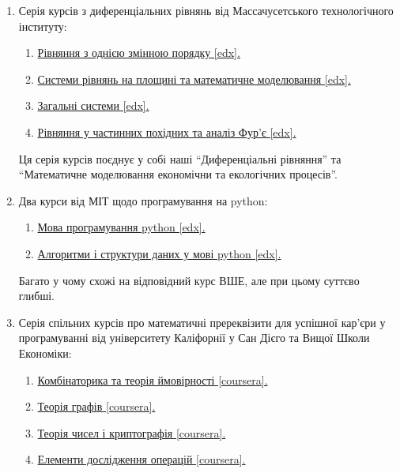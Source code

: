 \documentclass[14pt, a4paper]{extarticle}  %
\begin{document}
\begin{enumerate}
    \item Серія курсів з диференціальних рівнянь від Массачусетського технологічного інституту:
    \begin{enumerate}
    	\item \href{https://www.edx.org/course/introduction-differential-equations-mitx-18-031x}{Рівняння з однією змінною порядку [edx].}
    	\item \href{https://www.edx.org/course/differential-equations-2x2-systems-mitx-18-032x}{Системи рівнянь на площині та математичне моделювання [edx].}
    	\item \href{https://www.edx.org/course/differential-equations-linear-algebra-and-nxn-systems-of-differential-equations}{Загальні системи [edx].}
    	\item \href{https://www.edx.org/course/differential-equations-fourier-series-and-partial-differential-equations}{Рівняння у частинних похідних та аналіз Фур'є [edx].}
    \end{enumerate}
    Ця серія курсів поєднує у собі наші ``Диференціальні рівняння'' та ``Математичне моделювання економічни та екологічних процесів''.

    \item Два курси від МІТ щодо програмування на python:
    \begin{enumerate}
    	\item \href{https://www.edx.org/course/introduction-to-computer-science-and-programming-using-python-0}{Мова програмування python [edx].}
    	\item \href{https://www.edx.org/course/introduction-computational-thinking-data-mitx-6-00-2x-7}{Алгоритми і структури даних у мові python [edx].}
    \end{enumerate}
    Багато у чому схожі на відповідний курс ВШЕ, але при цьому суттєво глибші.

    \item Серія спільних курсів про математичні пререквізити для успішної кар'єри у програмуванні від університету Каліфорнії у Сан Дієго та Вищої Школи Економіки:
    \begin{enumerate}
    	\item \href{https://www.coursera.org/learn/combinatorics}{ Комбінаторика та теорія ймовірності [coursera].}
    	\item \href{https://www.coursera.org/learn/graphs}{Теорія графів [coursera].}
    	\item \href{https://www.coursera.org/learn/number-theory-cryptography}{Теорія чисел і криптографія [coursera].}
    	\item \href{https://www.coursera.org/learn/delivery-problem}{Елементи дослідження операцій [coursera].}
    \end{enumerate}
\end{enumerate}
\end{document}
